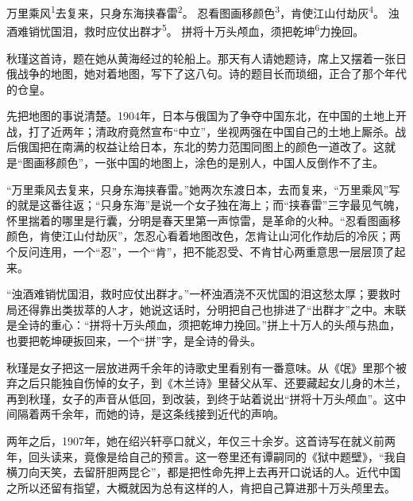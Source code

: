 
\begin{poem}
万里乘风\textsuperscript{1}去复来，只身东海挟春雷\textsuperscript{2}。
忍看图画移颜色\textsuperscript{3}，肯使江山付劫灰\textsuperscript{4}。
浊酒难销忧国泪，救时应仗出群才\textsuperscript{5}。
拼将十万头颅血，须把乾坤\textsuperscript{6}力挽回。
\end{poem}

\begin{annotations}
\end{annotations}

\begin{appreciation}
秋瑾这首诗，题在她从黄海经过的轮船上。那天有人请她题诗，席上又摆着一张日俄战争的地图，她对着地图，写下了这八句。诗的题目长而琐细，正合了那个年代的仓皇。

先把地图的事说清楚。1904年，日本与俄国为了争夺中国东北，在中国的土地上开战，打了近两年；清政府竟然宣布“中立”，坐视两强在中国自己的土地上厮杀。战后俄国把在南满的权益让给日本，东北的势力范围同图上的颜色一道改了。这就是“图画移颜色”，一张中国的地图上，涂色的是别人，中国人反倒作不了主。

“万里乘风去复来，只身东海挟春雷。”她两次东渡日本，去而复来，“万里乘风”写的就是这番往返；“只身东海”是说一个女子独在海上；而“挟春雷”三字最见气魄，怀里揣着的哪里是行囊，分明是春天里第一声惊雷，是革命的火种。“忍看图画移颜色，肯使江山付劫灰”，怎忍心看着地图改色，怎肯让山河化作劫后的冷灰；两个反问连用，一个“忍”，一个“肯”，把不能忍受、不肯甘心两重意思一层层顶了起来。

“浊酒难销忧国泪，救时应仗出群才。”一杯浊酒浇不灭忧国的泪这愁太厚；要救时局还得靠出类拔萃的人才，她说这话时，分明把自己也排进了“出群才”之中。末联是全诗的重心：“拼将十万头颅血，须把乾坤力挽回。”拼上十万人的头颅与热血，也要把乾坤硬扳回来，一个“拼”字，是全诗的骨头。

秋瑾是女子把这一层放进两千余年的诗歌史里看别有一番意味。从《氓》里那个被弃之后只能独自伤悼的女子，到《木兰诗》里替父从军、还要藏起女儿身的木兰，再到秋瑾，女子的声音从低回，到改装，到终于站着说出“拼将十万头颅血”。这中间隔着两千余年，而她的诗，是这条线接到近代的声响。

两年之后，1907年，她在绍兴轩亭口就义，年仅三十余岁。这首诗写在就义前两年，回头读来，竟像是给自己的预言。这一卷里还有谭嗣同的《狱中题壁》，“我自横刀向天笑，去留肝胆两昆仑”，都是把性命先押上去再开口说话的人。近代中国之所以还留有指望，大概就因为总有这样的人，肯把自己算进那十万头颅里去。
\end{appreciation}
